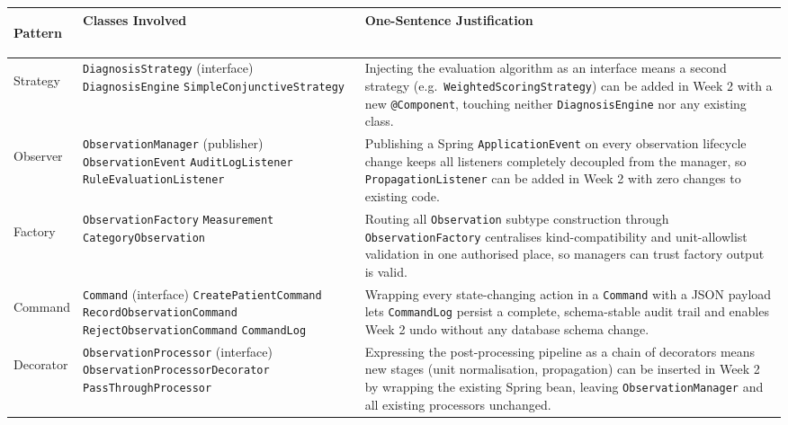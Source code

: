\documentclass[9pt]{article}
\begin{document}
\noindent
{\scriptsize
\begin{tabularx}{\linewidth}{@{}
    >{\bfseries\raggedright\arraybackslash}p{1.9cm}
    >{\raggedright\arraybackslash}p{5.6cm}
    >{\raggedright\arraybackslash}X
  @{}}
\toprule
\textbf{Pattern} & \textbf{Classes Involved} & \textbf{One-Sentence Justification} \\
\midrule
Strategy &
  \texttt{DiagnosisStrategy} (interface) \textbullet{}
  \texttt{DiagnosisEngine} \textbullet{}
  \texttt{SimpleConjunctiveStrategy} &
  Injecting the evaluation algorithm as an interface means a second strategy
  (e.g.\ \texttt{WeightedScoringStrategy}) can be added in Week 2 with a new
  \texttt{@Component}, touching neither \texttt{DiagnosisEngine} nor any existing class. \\[3pt]
Observer &
  \texttt{ObservationManager} (publisher) \textbullet{}
  \texttt{ObservationEvent} \textbullet{}
  \texttt{AuditLogListener} \textbullet{}
  \texttt{RuleEvaluationListener} &
  Publishing a Spring \texttt{ApplicationEvent} on every observation lifecycle change
  keeps all listeners completely decoupled from the manager, so
  \texttt{PropagationListener} can be added in Week 2 with zero changes to existing code. \\[3pt]
Factory &
  \texttt{ObservationFactory} \textbullet{}
  \texttt{Measurement} \textbullet{}
  \texttt{CategoryObservation} &
  Routing all \texttt{Observation} subtype construction through
  \texttt{ObservationFactory} centralises kind-compatibility and unit-allowlist
  validation in one authorised place, so managers can trust factory output is valid. \\[3pt]
Command &
  \texttt{Command} (interface) \textbullet{}
  \texttt{CreatePatientCommand} \textbullet{}
  \texttt{RecordObservationCommand} \textbullet{}
  \texttt{RejectObservationCommand} \textbullet{}
  \texttt{CommandLog} &
  Wrapping every state-changing action in a \texttt{Command} with a JSON payload
  lets \texttt{CommandLog} persist a complete, schema-stable audit trail and
  enables Week 2 undo without any database schema change. \\[3pt]
Decorator &
  \texttt{ObservationProcessor} (interface) \textbullet{}
  \texttt{ObservationProcessorDecorator} \textbullet{}
  \texttt{PassThroughProcessor} &
  Expressing the post-processing pipeline as a chain of decorators means new stages
  (unit normalisation, propagation) can be inserted in Week 2 by wrapping the existing
  Spring bean, leaving \texttt{ObservationManager} and all existing processors unchanged. \\
\bottomrule
\end{tabularx}
}
\end{document}

